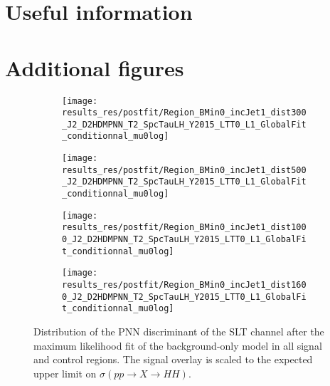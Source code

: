 \chapter{Useful information}
\label{sec:app}


\chapter{Additional figures}
\label{sec:app_additional_figures}


\begin{figure}[htbp]
  \centering

  \begin{subfigure}{0.495\textwidth}
    \centering

    \texttt{[image: results\_res/postfit/Region\_BMin0\_incJet1\_dist300\_J2\_D2HDMPNN\_T2\_SpcTauLH\_Y2015\_LTT0\_L1\_GlobalFit\_conditionnal\_mu0log]}
  \end{subfigure}\hfill%
  \begin{subfigure}{0.495\textwidth}
    \centering

    \texttt{[image: results\_res/postfit/Region\_BMin0\_incJet1\_dist500\_J2\_D2HDMPNN\_T2\_SpcTauLH\_Y2015\_LTT0\_L1\_GlobalFit\_conditionnal\_mu0log]}
  \end{subfigure}

  \begin{subfigure}{0.495\textwidth}
    \centering

    \texttt{[image: results\_res/postfit/Region\_BMin0\_incJet1\_dist1000\_J2\_D2HDMPNN\_T2\_SpcTauLH\_Y2015\_LTT0\_L1\_GlobalFit\_conditionnal\_mu0log]}
  \end{subfigure}\hfill%
  \begin{subfigure}{0.495\textwidth}
    \centering

    \texttt{[image: results\_res/postfit/Region\_BMin0\_incJet1\_dist1600\_J2\_D2HDMPNN\_T2\_SpcTauLH\_Y2015\_LTT0\_L1\_GlobalFit\_conditionnal\_mu0log]}
  \end{subfigure}

  \caption{Distribution of the PNN discriminant of the \lephad SLT
    channel after the maximum likelihood fit of the background-only
    model in all signal and control regions. The signal overlay is
    scaled to the expected upper limit on $\sigma(pp \to X \to HH)$.}
\end{figure}


